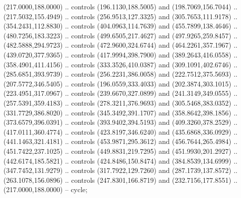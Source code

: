 \begin{scope}[shift={(-1.80372,0)},draw=black,fill=blue!30,line join=round,line width=0.208pt]
     (217.0000,188.0000) .. controls (196.1130,188.5005) and
      (198.7069,156.7044) .. (217.5032,155.4949) .. controls (256.9513,127.3325) and
      (305.7653,111.9178) .. (354.2431,112.8830) .. controls (404.0963,114.7639) and
      (455.7899,138.4646) .. (480.7256,183.3223) .. controls (499.6505,217.4627) and
      (497.9265,259.8457) .. (482.5888,294.9723) .. controls (472.9600,324.6744) and
      (464.2261,357.1967) .. (439.0720,377.9365) .. controls (417.9994,398.7900) and
      (389.2643,416.0558) .. (358.4901,411.4156) .. controls (333.3526,410.0387) and
      (309.1091,402.6746) .. (285.6851,393.9739) .. controls (256.2231,386.0058) and
      (222.7512,375.5693) .. (207.5772,346.5405) .. controls (196.0559,333.4033) and
      (202.3874,303.1015) .. (223.4951,317.0967) .. controls (239.6670,327.0899) and
      (241.3149,349.0555) .. (257.5391,359.4183) .. controls (278.3211,376.9693) and
      (305.5468,383.0352) .. (331.7729,386.8020) .. controls (345.3492,391.1707) and
      (358.8642,398.1856) .. (373.6579,396.0391) .. controls (393.9402,394.5193) and
      (409.3260,378.2529) .. (417.0111,360.4774) .. controls (423.8197,346.6240) and
      (435.6868,336.0929) .. (441.1463,321.4181) .. controls (453.9871,295.3612) and
      (456.7644,265.4984) .. (451.7422,237.1025) .. controls (449.8831,219.7295) and
      (451.9930,201.2927) .. (442.6174,185.5821) .. controls (424.8486,150.8474) and
      (384.8539,134.6999) .. (347.7452,131.9279) .. controls (317.7922,129.7260) and
      (287.1739,137.8572) .. (263.1078,156.0896) .. controls (247.8301,166.8719) and
      (232.7156,177.8551) .. (217.0000,188.0000) -- cycle;
\end{scope}

